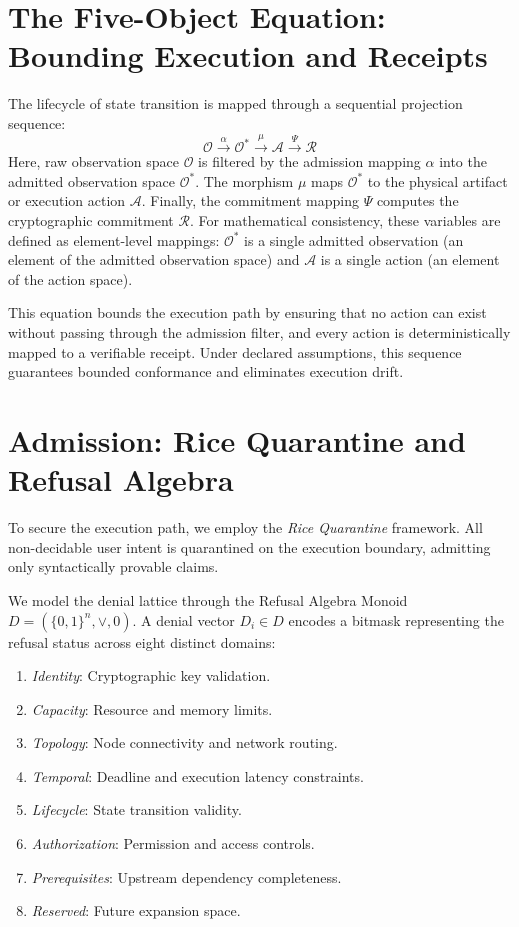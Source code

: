 \documentclass[11pt,a4paper]{article}
\begin{document}
\section[The Five-Object Equation: Bounding Execution and Receipts]{The Five-Object Equation:\\ Bounding Execution and Receipts}
The lifecycle of state transition is mapped through a sequential projection sequence:
\begin{equation}
\mathcal{O} \xrightarrow{\alpha} \mathcal{O}^* \xrightarrow{\mu} \mathcal{A} \xrightarrow{\Psi} \mathcal{R}
\end{equation}
Here, raw observation space $\mathcal{O}$ is filtered by the admission mapping $\alpha$ into the admitted observation space $\mathcal{O}^*$. The morphism $\mu$ maps $\mathcal{O}^*$ to the physical artifact or execution action $\mathcal{A}$. Finally, the commitment mapping $\Psi$ computes the cryptographic commitment $\mathcal{R}$. For mathematical consistency, these variables are defined as element-level mappings: $\mathcal{O}^*$ is a single admitted observation (an element of the admitted observation space) and $\mathcal{A}$ is a single action (an element of the action space).

This equation bounds the execution path by ensuring that no action can exist without passing through the admission filter, and every action is deterministically mapped to a verifiable receipt. Under declared assumptions, this sequence guarantees bounded conformance and eliminates execution drift.

\section{Admission: Rice Quarantine and Refusal Algebra}
To secure the execution path, we employ the \emph{Rice Quarantine} framework. All non-decidable user intent is quarantined on the execution boundary, admitting only syntactically provable claims. 

We model the denial lattice through the Refusal Algebra Monoid $D = (\{0,1\}^n, \lor, 0)$. A denial vector $D_i \in D$ encodes a bitmask representing the refusal status across eight distinct domains:
\begin{enumerate}
    \item \emph{Identity}: Cryptographic key validation.
    \item \emph{Capacity}: Resource and memory limits.
    \item \emph{Topology}: Node connectivity and network routing.
    \item \emph{Temporal}: Deadline and execution latency constraints.
    \item \emph{Lifecycle}: State transition validity.
    \item \emph{Authorization}: Permission and access controls.
    \item \emph{Prerequisites}: Upstream dependency completeness.
    \item \emph{Reserved}: Future expansion space.
\end{enumerate}
\end{document}
